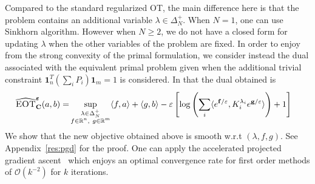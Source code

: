 Compared to the standard regularized OT,  the main difference here is that the problem contains an additional variable $\lambda\in\Delta_N^{+}$. 
When $N=1$, one can use Sinkhorn algorithm. However when $N\geq 2$, we do not have a closed form for updating $\lambda$ when the other variables of the problem are fixed. In order to enjoy from the strong convexity of the primal formulation, we consider instead the dual associated with the equivalent primal problem given when the additional trivial constraint $\mathbf{1}_n^T\left(\sum_i P_i\right)\mathbf{1}_m = 1$  is considered. In that the dual obtained is
\begin{align*}
\label{eq-obj-proj-sin}
    \widehat{\textsc{EOT}}_{\mathbf{C}}^{\bm{\varepsilon}}(a,b)=&\sup\limits_{\substack{\lambda\in\Delta_N^{+}\\f\in \mathbb{R}^n,~g\in \mathbb{R}^m}} \langle f, a\rangle+\langle g,b\rangle
    -\varepsilon\left[\log\left(\sum_i\langle e^{\mathbf{f}/\varepsilon},K_i^{\lambda_i} e^{\mathbf{g}/\varepsilon}\rangle \right) + 1\right]
\end{align*}
We show that the new objective obtained above is smooth w.r.t $(\lambda,f,g)$. See Appendix~\ref{res:pgd} for the proof. One can  apply the accelerated projected gradient ascent~\citep{beck2009fast,tseng2008accelerated} which enjoys an optimal convergence rate for first order methods of $\mathcal{O}(k^{-2})$ for $k$ iterations.%
